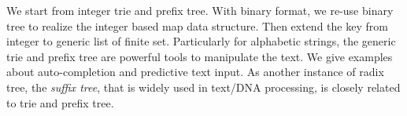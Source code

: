 \documentclass[b5paper]{article}
\begin{document}
We start from integer trie and prefix tree. With binary format, we re-use binary tree to realize the integer based map data structure. Then extend the key from integer to generic list of finite set. Particularly for alphabetic strings, the generic trie and prefix tree are powerful tools to manipulate the text. We give examples about auto-completion and predictive text input. As another instance of radix tree, the {\em suffix tree}, that is widely used in text/DNA processing, is closely related to trie and prefix tree.

\begin{Exercise}[label={ex:prefix-tree-app}]
\end{Exercise}
\end{document}
